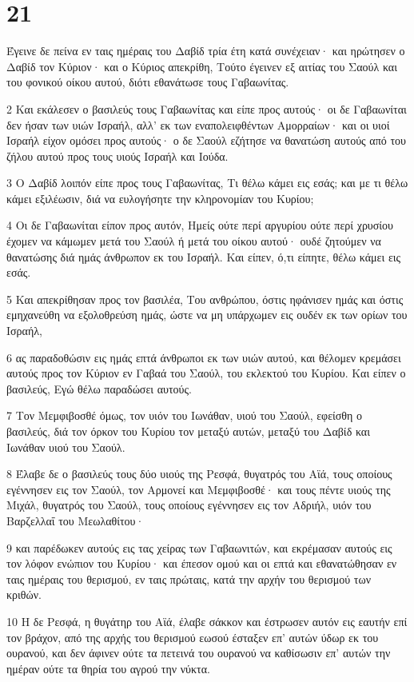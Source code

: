 \chapter{21}

\par Έγεινε δε πείνα εν ταις ημέραις του Δαβίδ τρία έτη κατά συνέχειαν· και ηρώτησεν ο Δαβίδ τον Κύριον· και ο Κύριος απεκρίθη, Τούτο έγεινεν εξ αιτίας του Σαούλ και του φονικού οίκου αυτού, διότι εθανάτωσε τους Γαβαωνίτας.
\par 2 Και εκάλεσεν ο βασιλεύς τους Γαβαωνίτας και είπε προς αυτούς· οι δε Γαβαωνίται δεν ήσαν των υιών Ισραήλ, αλλ' εκ των εναπολειφθέντων Αμορραίων· και οι υιοί Ισραήλ είχον ομόσει προς αυτούς· ο δε Σαούλ εζήτησε να θανατώση αυτούς από του ζήλου αυτού προς τους υιούς Ισραήλ και Ιούδα.
\par 3 Ο Δαβίδ λοιπόν είπε προς τους Γαβαωνίτας, Τι θέλω κάμει εις εσάς; και με τι θέλω κάμει εξιλέωσιν, διά να ευλογήσητε την κληρονομίαν του Κυρίου;
\par 4 Οι δε Γαβαωνίται είπον προς αυτόν, Ημείς ούτε περί αργυρίου ούτε περί χρυσίου έχομεν να κάμωμεν μετά του Σαούλ ή μετά του οίκου αυτού· ουδέ ζητούμεν να θανατώσης διά ημάς άνθρωπον εκ του Ισραήλ. Και είπεν, ό,τι είπητε, θέλω κάμει εις εσάς.
\par 5 Και απεκρίθησαν προς τον βασιλέα, Του ανθρώπου, όστις ηφάνισεν ημάς και όστις εμηχανεύθη να εξολοθρεύση ημάς, ώστε να μη υπάρχωμεν εις ουδέν εκ των ορίων του Ισραήλ,
\par 6 ας παραδοθώσιν εις ημάς επτά άνθρωποι εκ των υιών αυτού, και θέλομεν κρεμάσει αυτούς προς τον Κύριον εν Γαβαά του Σαούλ, του εκλεκτού του Κυρίου. Και είπεν ο βασιλεύς, Εγώ θέλω παραδώσει αυτούς.
\par 7 Τον Μεμφιβοσθέ όμως, τον υιόν του Ιωνάθαν, υιού του Σαούλ, εφείσθη ο βασιλεύς, διά τον όρκον του Κυρίου τον μεταξύ αυτών, μεταξύ του Δαβίδ και Ιωνάθαν υιού του Σαούλ.
\par 8 Έλαβε δε ο βασιλεύς τους δύο υιούς της Ρεσφά, θυγατρός του Αϊά, τους οποίους εγέννησεν εις τον Σαούλ, τον Αρμονεί και Μεμφιβοσθέ· και τους πέντε υιούς της Μιχάλ, θυγατρός του Σαούλ, τους οποίους εγέννησεν εις τον Αδριήλ, υιόν του Βαρζελλαΐ του Μεωλαθίτου·
\par 9 και παρέδωκεν αυτούς εις τας χείρας των Γαβαωνιτών, και εκρέμασαν αυτούς εις τον λόφον ενώπιον του Κυρίου· και έπεσον ομού και οι επτά και εθανατώθησαν εν ταις ημέραις του θερισμού, εν ταις πρώταις, κατά την αρχήν του θερισμού των κριθών.
\par 10 Η δε Ρεσφά, η θυγάτηρ του Αϊά, έλαβε σάκκον και έστρωσεν αυτόν εις εαυτήν επί τον βράχον, από της αρχής του θερισμού εωσού έσταξεν επ' αυτών ύδωρ εκ του ουρανού, και δεν άφινεν ούτε τα πετεινά του ουρανού να καθίσωσιν επ' αυτών την ημέραν ούτε τα θηρία του αγρού την νύκτα.
